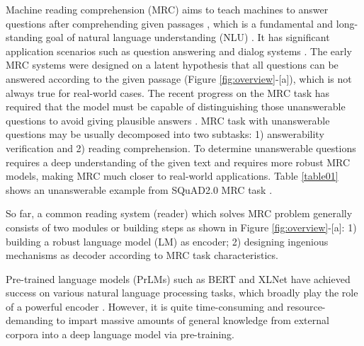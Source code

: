 \documentclass[letterpaper]{article} %
\begin{document}
Machine reading comprehension (MRC) aims to teach machines to answer questions after comprehending given passages \cite{hermann2015teaching,Joshi2017TriviaQA,Rajpurkar2018Know}, which is a fundamental and long-standing goal of natural language understanding (NLU) \cite{zhang2020mrc}. It has significant application scenarios %
such as question answering and dialog systems \cite{zhang2018modeling,choi2018quac,reddy2019coqa,zhang2018mrc,xu2020topic,zhu2018lingke}.
The early MRC systems \cite{kadlec2016text,Chen2016A,Dhingra2017Gated,Wang2017Gated,Seo2016Bidirectional} were designed on a latent hypothesis that all questions can be answered according to the given passage (Figure \ref{fig:overview}-[a]), which is not always true for real-world cases. %
The recent progress on the MRC task has required that the model must be capable of distinguishing those unanswerable questions to avoid giving plausible answers \cite{Rajpurkar2018Know}. MRC task with unanswerable questions may be usually decomposed into two subtasks: 1) answerability verification and 2) reading comprehension.
To determine unanswerable questions requires a deep understanding of the given text and requires more robust MRC models, making MRC much closer to real-world applications. Table \ref{table01} shows an unanswerable example from SQuAD2.0 MRC task \cite{Rajpurkar2018Know}.






So far, a common reading system (reader) which solves MRC problem generally consists of two modules or building steps as shown in Figure \ref{fig:overview}-[a]:
1) building a robust language model (LM) as encoder; 2) designing ingenious mechanisms as decoder according to MRC task characteristics.

Pre-trained language models (PrLMs) such as BERT \cite{devlin2018bert} and XLNet \cite{yang2019xlnet} have achieved success on various natural language processing tasks, which broadly play the role of a powerful encoder \cite{zhang2019explicit,li2020explicit,zhou2019limit}. %
However, it is quite time-consuming and resource-demanding to impart massive amounts of general knowledge from external corpora into a deep language model via pre-training. %
\end{document}
